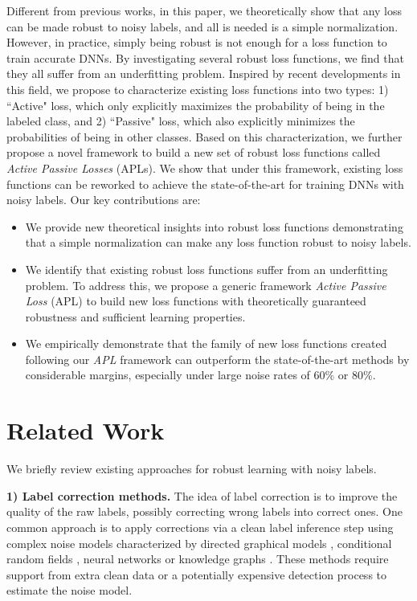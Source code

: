 \documentclass{article}
\begin{document}
Different from previous works, in this paper, 
we theoretically show that any loss can be made robust to noisy labels, and all is needed is a simple normalization.
However, in practice, simply being robust is not enough for a loss function to train accurate DNNs. By investigating several robust loss functions, we find that they all suffer from an underfitting problem. Inspired by recent developments in this field, we propose to characterize existing loss functions into two types: 1) ``Active" loss, which only explicitly maximizes the probability of being in the labeled class, and 2) ``Passive" loss, which also explicitly minimizes the probabilities of being in other classes. Based on this characterization, we further propose a novel framework to build a new set of robust loss functions called \emph{Active Passive Losses} (APLs).
We show that under this framework, existing loss functions can be reworked to achieve the state-of-the-art for training DNNs with noisy labels. Our key contributions are:
\begin{itemize}[leftmargin= *]
  \item  We provide new theoretical insights into robust loss functions demonstrating that a simple normalization can make any loss function robust to noisy labels.
  
  \item We identify that existing robust loss functions suffer from an underfitting problem. To address this, we propose a generic framework \emph{Active Passive Loss} (APL) to build new loss functions with theoretically guaranteed robustness and sufficient learning properties.
 
  \item We empirically demonstrate that the family of new loss functions created following our \emph{APL} framework can outperform the state-of-the-art methods by considerable margins, especially under large noise rates of 60\% or 80\%.
\end{itemize}


\section{Related Work}
\label{sec:related}
We briefly review existing approaches for robust learning with noisy labels.

\noindent\textbf{1) Label correction methods.}
The idea of label correction is to improve the quality of the raw labels, possibly correcting wrong labels into correct ones. One common approach is to apply corrections via a clean label inference step using complex noise models characterized by directed graphical models \cite{xiao2015learning}, conditional random fields \cite{vahdat2017toward}, neural networks \cite{lee2017cleannet,veit2017learning} or knowledge graphs \cite{li2017learning}. These methods require support from extra clean data or a potentially expensive detection process to estimate the noise model. 
\end{document}
